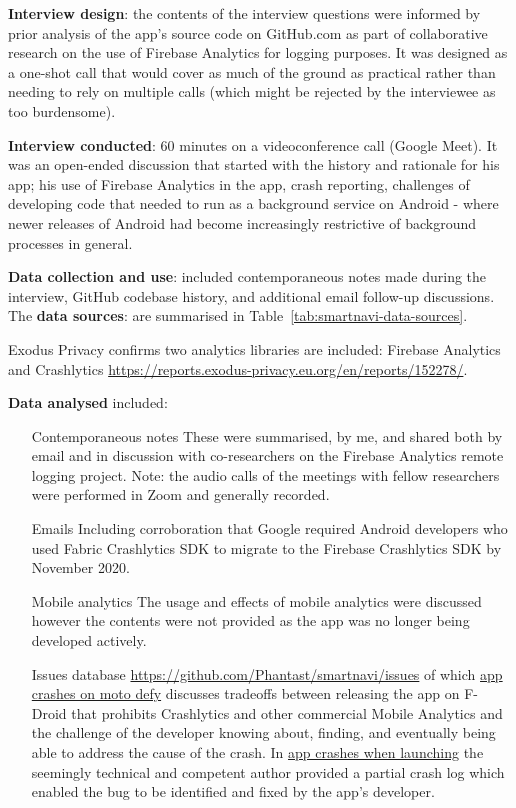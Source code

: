 \textbf{Interview design}: the contents of the interview questions were informed by prior analysis of the app's source code on GitHub.com as part of collaborative research on the use of Firebase Analytics for logging purposes. It was designed as a one-shot call that would cover as much of the ground as practical rather than needing to rely on multiple calls (which might be rejected by the interviewee as too burdensome).

\textbf{Interview conducted}: 60 minutes on a videoconference call (Google Meet). It was an open-ended discussion that started with the history and rationale for his app; his use of Firebase Analytics in the app, crash reporting, challenges of developing code that needed to run as a background service on Android -  where newer releases of Android had become increasingly restrictive of background processes in general.

\textbf{Data collection and use}: included contemporaneous notes made during the interview,  GitHub codebase history, and additional email follow-up discussions. The \textbf{data sources}: are summarised in Table~\ref{tab:smartnavi-data-sources}.

Exodus Privacy confirms two analytics libraries are included: Firebase Analytics and Crashlytics \url{https://reports.exodus-privacy.eu.org/en/reports/152278/}.%
 
\textbf{Data analysed} included:
\begin{itemize}
    \item[Contemporaneous notes] These were summarised, by me, and shared both by email and in discussion with co-researchers on the Firebase Analytics remote logging project. Note: the audio calls of the meetings with fellow researchers were performed in Zoom and generally recorded. 
    \item[Emails] Including corroboration that Google required Android developers who used Fabric Crashlytics SDK to migrate to the Firebase Crashlytics SDK by  November 2020.
    \item[Mobile analytics] The usage and effects of mobile analytics were discussed however the contents were not provided as the app was no longer being developed actively.
    \item[Issues database] \url{https://github.com/Phantast/smartnavi/issues} of which \href{https://github.com/Phantast/smartnavi/issues/10}{app crashes on moto defy} discusses tradeoffs between releasing the app on F-Droid that prohibits Crashlytics and other  commercial Mobile Analytics and the challenge of the developer knowing about, finding, and eventually being able to address the cause of the crash. In \href{https://github.com/Phantast/smartnavi/issues/11}{app crashes when launching} the seemingly technical and competent author provided a partial crash log which enabled the bug to be identified and fixed by the app's developer.
\end{itemize}


